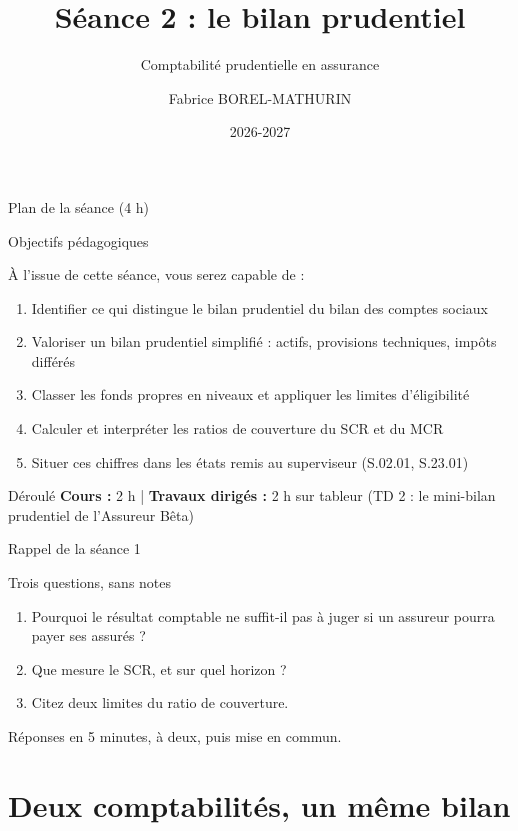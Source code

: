 \documentclass[10pt,aspectratio=169]{beamer}
\title[Séance 2 -- Le bilan prudentiel]{Séance 2 : le bilan prudentiel}
\subtitle{Comptabilité prudentielle en assurance}
\author[F. Borel-Mathurin]{Fabrice BOREL-MATHURIN}
\institute[ACPR-DEAR et SAF Lyon 1]{
    ACPR - DEAR\\
    et\\
    Laboratoire SAF Université Claude Bernard Lyon 1
}
\date{2026-2027}
\begin{document}
\frame{\titlepage}

\begin{frame}{Plan de la séance (4 h)}
\tableofcontents
\end{frame}

\begin{frame}{Objectifs pédagogiques}
\begin{block}{À l'issue de cette séance, vous serez capable de :}
\begin{enumerate}
  \item Identifier ce qui distingue le bilan prudentiel du bilan des comptes sociaux
  \item Valoriser un bilan prudentiel simplifié : actifs, provisions techniques, impôts différés
  \item Classer les fonds propres en niveaux et appliquer les limites d'éligibilité
  \item Calculer et interpréter les ratios de couverture du SCR et du MCR
  \item Situer ces chiffres dans les états remis au superviseur (S.02.01, S.23.01)
\end{enumerate}
\end{block}
\vspace{0.3cm}
\begin{alertblock}{Déroulé}
\textbf{Cours :} 2 h \quad | \quad \textbf{Travaux dirigés :} 2 h sur tableur (TD 2 : le mini-bilan prudentiel de l'Assureur Bêta)
\end{alertblock}
\end{frame}

\begin{frame}{Rappel de la séance 1}
\begin{block}{Trois questions, sans notes}
\begin{enumerate}
  \item Pourquoi le résultat comptable ne suffit-il pas à juger si un assureur pourra payer ses assurés ?
  \item Que mesure le SCR, et sur quel horizon ?
  \item Citez deux limites du ratio de couverture.
\end{enumerate}
\end{block}
\vspace{0.2cm}
\small Réponses en 5 minutes, à deux, puis mise en commun.
\end{frame}

\section{Deux comptabilités, un même bilan}
\end{document}
